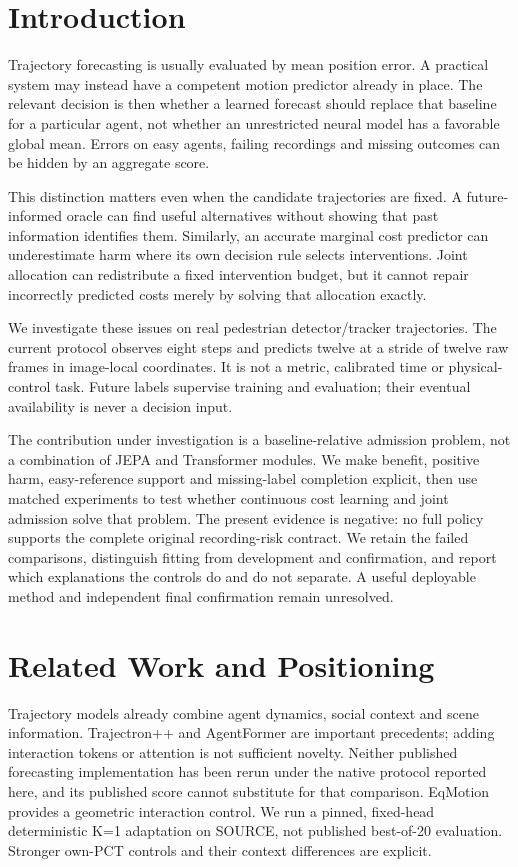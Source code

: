 \documentclass[10pt,twocolumn,letterpaper]{article}
\begin{document}
\section{Introduction}
Trajectory forecasting is usually evaluated by mean position error. A practical
system may instead have a competent motion predictor already in place. The
relevant decision is then whether a learned forecast should replace that
baseline for a particular agent, not whether an unrestricted neural model has
a favorable global mean. Errors on easy agents, failing recordings and missing
outcomes can be hidden by an aggregate score.

This distinction matters even when the candidate trajectories are fixed. A
future-informed oracle can find useful alternatives without showing that past
information identifies them. Similarly, an accurate marginal cost predictor
can underestimate harm where its own decision rule selects interventions.
Joint allocation can redistribute a fixed intervention budget, but it cannot
repair incorrectly predicted costs merely by solving that allocation exactly.

We investigate these issues on real pedestrian detector/tracker trajectories.
The current protocol observes eight steps and predicts twelve at a stride of
twelve raw frames in image-local coordinates. It is not a metric, calibrated
time or physical-control task. Future labels supervise training and evaluation;
their eventual availability is never a decision input.

The contribution under investigation is a baseline-relative admission problem,
not a combination of JEPA and Transformer modules. We make benefit, positive
harm, easy-reference support and missing-label completion explicit, then use
matched experiments to test whether continuous cost learning and joint
admission solve that problem. The present evidence is negative: no full policy
supports the complete original recording-risk contract. We retain the failed
comparisons, distinguish fitting from development and confirmation, and report
which explanations the controls do and do not separate. A useful deployable
method and independent final confirmation remain unresolved.

\section{Related Work and Positioning}
Trajectory models already combine agent dynamics, social context and scene
information. Trajectron++ \cite{ref1} and AgentFormer \cite{ref2} are important precedents;
adding interaction tokens or attention is not sufficient novelty. Neither
published forecasting implementation has been rerun under the native protocol
reported here, and its published score cannot substitute for that comparison.
EqMotion \cite{ref9} provides a geometric interaction control. We run a pinned,
fixed-head deterministic K=1 adaptation on SOURCE, not published best-of-20
evaluation. Stronger own-PCT controls and their context differences are explicit.
\end{document}
